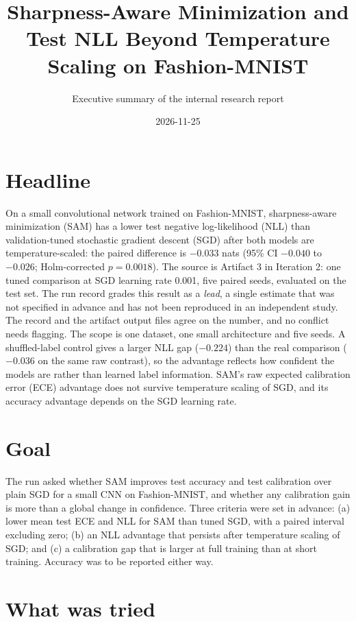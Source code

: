 \documentclass[10pt,letterpaper]{article}
\title{Sharpness-Aware Minimization and Test NLL Beyond Temperature Scaling on Fashion-MNIST}
\author{Executive summary of the internal research report}
\date{2026-11-25}
\begin{document}
\maketitle

\section{Headline}

On a small convolutional network trained on Fashion-MNIST, sharpness-aware minimization (SAM) has a lower test negative log-likelihood (NLL) than validation-tuned stochastic gradient descent (SGD) after both models are temperature-scaled: the paired difference is $-0.033$ nats (95\% CI $-0.040$ to $-0.026$; Holm-corrected $p = 0.0018$). The source is Artifact 3 in Iteration 2: one tuned comparison at SGD learning rate 0.001, five paired seeds, evaluated on the test set. The run record grades this result as a \emph{lead}, a single estimate that was not specified in advance and has not been reproduced in an independent study. The record and the artifact output files agree on the number, and no conflict needs flagging. The scope is one dataset, one small architecture and five seeds. A shuffled-label control gives a larger NLL gap ($-0.224$) than the real comparison ($-0.036$ on the same raw contrast), so the advantage reflects how confident the models are rather than learned label information. SAM's raw expected calibration error (ECE) advantage does not survive temperature scaling of SGD, and its accuracy advantage depends on the SGD learning rate.

\section{Goal}

The run asked whether SAM improves test accuracy and test calibration over plain SGD for a small CNN on Fashion-MNIST, and whether any calibration gain is more than a global change in confidence. Three criteria were set in advance: (a) lower mean test ECE and NLL for SAM than tuned SGD, with a paired interval excluding zero; (b) an NLL advantage that persists after temperature scaling of SGD; and (c) a calibration gap that is larger at full training than at short training. Accuracy was to be reported either way.

\section{What was tried}
\end{document}
